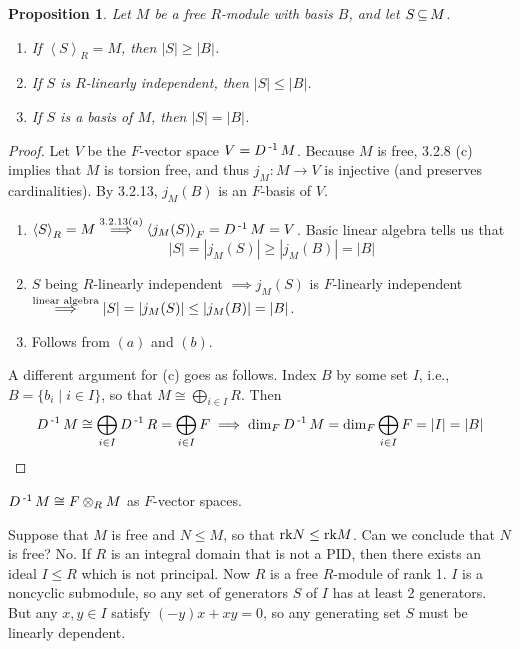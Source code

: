 \documentclass[11pt]{book}
\newcounter{counter}
\newtheorem{proposition}[counter]{Proposition}   \newtheorem{problem}[counter]{Problem}   \newtheorem*{proposition*}{Proposition}   \newtheorem*{lemma*}{Lemma}
\theoremstyle{definition}   \newtheorem{defn}[counter]{Definition} %
\newcommand{\gen}[1]{\left\langle #1 \right\rangle}   \newcommand{\stab}[2]{\tn{Stab}_{#1}(#2)}   \newcommand{\fix}[2]{\tn{Fix}_{#1}(#2)}   \newcommand{\op}{^{\tn{op}}}
\DeclareMathOperator{\ra}{\rightarrow}   \DeclareMathOperator{\Poly}{\mathbf{P}}   \DeclareMathOperator{\spn}{\textnormal{span}}   \DeclareMathOperator{\aut}{\textnormal{Aut}}
\newcommand{\vs}{\vspace{8pt}}
\numberwithin{counter}{chapter}
\begin{document}
\vs

\begin{proposition}
Let $M$ be a free $R$-module with basis $B$, and let $S \operatorname{\subseteq} M$.
\begin{enumerate}
\item[(a)] If $\gen{S}_R = M$, then $|S| \geq |B|$.
\item[(b)] If $S$ is $R$-linearly independent, then $|S| \leq |B|$.
\item[(c)] If $S$ is a basis of $M$, then $|S| = |B|$.
\end{enumerate}
\end{proposition}

\begin{proof}
Let $V$ be the $F$-vector space $V = D\operatorname{^{-1}} M$. Because $M$ is free, 3.2.8 (c) implies that $M$ is torsion free, and thus $j_M : M \ra V$ is injective (and preserves cardinalities). By 3.2.13, $j_M(B)$ is an $F$-basis of $V$.
\begin{enumerate}
\item[(a)] $\gen{S}_R = M \overset{3.2.13 (a)}{\implies} \gen{j_M(S)}_F = D\inv M = V$. Basic linear algebra tells us that
	\[|S| = |j_M(S)| \geq |j_M(B)| = |B| \]
\item[(b)] $S$ being $R$-linearly independent $\implies j_M(S)$ is $F$-linearly independent $\overset{\textnormal{linear algebra}}{\implies} |S| = |j_M(S)| \leq |j_M(B)| = |B|$.
\item[(c)] Follows from $(a)$ and $(b)$.
\end{enumerate}

A different argument for (c) goes as follows. Index $B$ by some set $I$, i.e., $B = \{b_i \mid i \in I\}$, so that $M \cong \bigoplus_{i \in I} R$. Then
	\[D\operatorname{^{-1}} M \cong \bigoplus_{i \in I} D\operatorname{^{-1}} R = \bigoplus_{i \in I} F \implies \dim_F D\operatorname{^{-1}} M = \dim_F \bigoplus_{i \in I} F = |I| = |B| \]
\end{proof}

\vs

\begin{remark*}
$D\operatorname{^{-1}} M \cong F \otimes_R M$ as $F$-vector spaces.
\end{remark*}

\vs

Suppose that $M$ is free and $N \leq M$, so that $\textnormal{rk} N \leq \textnormal{rk} M$. Can we conclude that $N$ is free? No. If $R$ is an integral domain that is not a PID, then there exists an ideal $I \leq R$ which is not principal. Now $R$ is a free $R$-module of rank 1. $I$ is a noncyclic submodule, so any set of generators $S$ of $I$ has at least 2 generators. But any $x,y \in I$ satisfy $(-y) x + x y = 0$, so any generating set $S$ must be linearly dependent.
\end{document}
